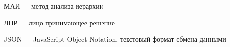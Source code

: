 


\hypertarget{mai}{МАИ --- метод анализа иерархии}






\hypertarget{lpr}{ЛПР --- лицо принимающее решение}










\hypertarget{json}{JSON --- JavaScript Object Notation, текстовый формат обмена данными}

\clearpage
